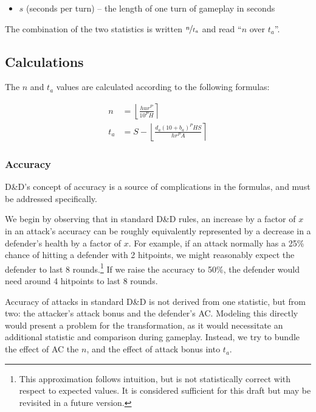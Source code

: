 \documentclass[twocolumn]{article}
\begin{document}
\begin{itemize}
    \item $s$ (seconds per turn) -- the length of one turn of gameplay in seconds
\end{itemize}


The combination of the two statistics is written $\nicefrac{n}{t_a}$
and read ``$n$ over $t_a$''.

\subsection{Calculations}

The $n$ and $t_a$ values are calculated according to the following formulas:

\begin{align*}
    n   &=  
        \left\lfloor
            \frac
                {h u r^P}
                {10^P H}
        \right\rceil \\
    t_a &=
        S -
        \left\lfloor
            \frac
                {d_a (10 + b_{a})^P H S}
                {h r^P A}
        \right\rceil
\end{align*}

\subsubsection{Accuracy}

D\&D's concept of accuracy is a source of complications in the formulas,
and must be addressed specifically.

We begin by observing that in standard D\&D rules,
an increase by a factor of $x$ in an attack's accuracy
can be roughly equivalently represented by a decrease in a defender's
health by a factor of $x$.
For example, if an attack normally has a 25\% chance of hitting a defender with 2 hitpoints,
we might reasonably expect the defender to last 8 rounds.\footnote{
    This approximation follows intuition,
    but is not statistically correct with respect to expected values.
    It is considered sufficient for this draft
    but may be revisited in a future version.
}
If we raise the accuracy to 50\%,
the defender would need around 4 hitpoints to last 8 rounds.

Accuracy of attacks in standard D\&D is not derived from one statistic,
but from two: the attacker's attack bonus and the defender's AC.
Modeling this directly would present a problem for the transformation,
as it would necessitate an additional statistic and comparison during gameplay.
Instead, we try to bundle the effect of AC the $n$,
and the effect of attack bonus into $t_a$.
\end{document}
